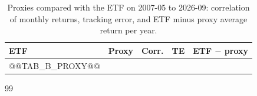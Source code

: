 \documentclass[11pt,a4paper]{article}
\begin{document}
\begin{table}[htbp]
\centering
\caption{Proxies compared with the ETF on 2007-05 to 2026-09: correlation of monthly returns, tracking error,
and ETF minus proxy average return per year.}
\label{tab:proxy}
\small
\begin{tabular}{@{}llrrr@{}}
\toprule
ETF & Proxy & Corr. & TE & ETF $-$ proxy \\
\midrule
@@TAB_B_PROXY@@
\bottomrule
\end{tabular}
\end{table}

\begin{thebibliography}{99}
\end{thebibliography}
\end{document}
